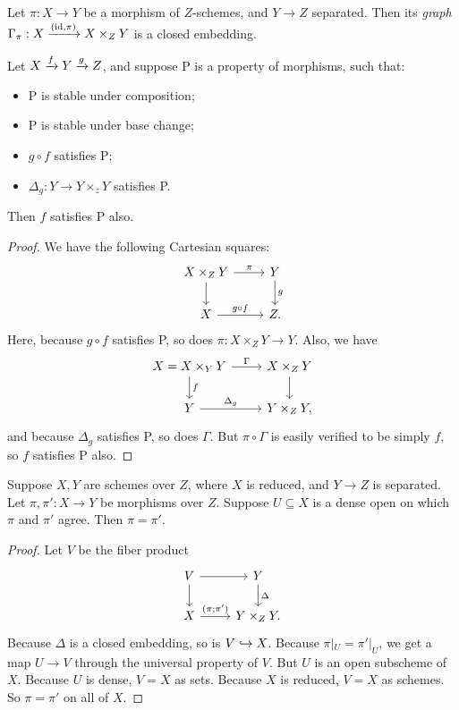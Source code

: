 \documentclass[11pt]{amsart}
\begin{document}
\begin{prop}
Let $\pi: X\to Y$ be a morphism of $Z$-schemes, and $Y\to Z$ separated. Then its \emph{graph} $\Gamma_{\pi}: X\xrightarrow{(\operatorname{id}, \pi)} X\times_Z Y$ is a closed embedding.
\end{prop}


\begin{prop}
Let $X\xrightarrow{f} Y\xrightarrow{g} Z$, and suppose P is a property of morphisms, such that:
\begin{itemize}
    \item P is stable under composition;
    \item P is stable under base change;
    \item $g\circ f$ satisfies P;
    \item $\Delta_g: Y\to Y\times_z Y$ satisfies P.
\end{itemize}
Then $f$ satisfies P also.
\end{prop}

\begin{proof}
We have the following Cartesian squares:
\[
\begin{tikzcd}
X \times_Z Y \arrow[r, "\pi"] \arrow[d] & Y \arrow[d, "g"] \\
X \arrow[r, "g\circ f"] & Z.
\end{tikzcd}
\]
Here, because $g\circ f$ satisfies P, so does $\pi: X\times_Z Y\to Y$. Also, we have 
\[
\begin{tikzcd}
X = X\times_Y Y \arrow[r, "\Gamma"] \arrow[d, "f"] & X\times_Z Y \arrow[d] \\
Y \arrow[r, "\Delta_g"] & Y\times_Z Y,
\end{tikzcd}
\]
and because $\Delta_g$ satisfies P, so does $\Gamma$. But $\pi\circ \Gamma$ is easily verified to be simply $f$, so $f$ satisfies P also.
\end{proof}

\begin{thm}
Suppose $X,Y$ are schemes over $Z$, where $X$ is reduced, and $Y\to Z$ is separated. Let $\pi,\pi':X\to Y$ be morphisms over $Z$. Suppose $U\subseteq X$ is a dense open on which $\pi$ and $\pi'$ agree. Then $\pi = \pi'$.
\end{thm}

\begin{proof}
Let $V$ be the fiber product
\[
\begin{tikzcd}
V \arrow[r] \arrow[d] & Y \arrow[d, "\Delta"] \\
X \arrow[r, "(\pi;\pi')"] & Y\times_Z Y.
\end{tikzcd}
\]
Because $\Delta$ is a closed embedding, so is $V\hookrightarrow X$. Because $\pi|_U = \pi'|_U$, we get a map $U\to V$ through the universal property of $V$. But $U$ is an open subscheme of $X$. Because $U$ is dense, $V =X$ as sets. Because $X$ is reduced, $V=X$ as schemes. So $\pi = \pi'$ on all of $X$. 
\end{proof}
\end{document}
